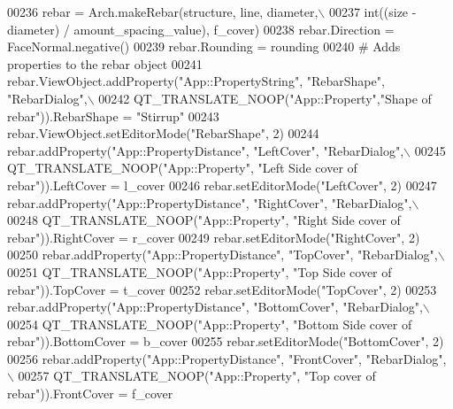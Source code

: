 \begin{DoxyCode}
00236         rebar = Arch.makeRebar(structure, line, diameter,\(\backslash\)
00237             int((size - diameter) / amount\_spacing\_value), f\_cover)
00238     rebar.Direction = FaceNormal.negative()
00239     rebar.Rounding = rounding
00240     \textcolor{comment}{# Adds properties to the rebar object}
00241     rebar.ViewObject.addProperty(\textcolor{stringliteral}{"App::PropertyString"}, \textcolor{stringliteral}{"RebarShape"}, \textcolor{stringliteral}{"RebarDialog"},\(\backslash\)
00242         QT\_TRANSLATE\_NOOP(\textcolor{stringliteral}{"App::Property"},\textcolor{stringliteral}{"Shape of rebar"})).RebarShape = \textcolor{stringliteral}{"Stirrup"}
00243     rebar.ViewObject.setEditorMode(\textcolor{stringliteral}{"RebarShape"}, 2)
00244     rebar.addProperty(\textcolor{stringliteral}{"App::PropertyDistance"}, \textcolor{stringliteral}{"LeftCover"}, \textcolor{stringliteral}{"RebarDialog"},\(\backslash\)
00245         QT\_TRANSLATE\_NOOP(\textcolor{stringliteral}{"App::Property"}, \textcolor{stringliteral}{"Left Side cover of rebar"})).LeftCover = l\_cover
00246     rebar.setEditorMode(\textcolor{stringliteral}{"LeftCover"}, 2)
00247     rebar.addProperty(\textcolor{stringliteral}{"App::PropertyDistance"}, \textcolor{stringliteral}{"RightCover"}, \textcolor{stringliteral}{"RebarDialog"},\(\backslash\)
00248         QT\_TRANSLATE\_NOOP(\textcolor{stringliteral}{"App::Property"}, \textcolor{stringliteral}{"Right Side cover of rebar"})).RightCover = r\_cover
00249     rebar.setEditorMode(\textcolor{stringliteral}{"RightCover"}, 2)
00250     rebar.addProperty(\textcolor{stringliteral}{"App::PropertyDistance"}, \textcolor{stringliteral}{"TopCover"}, \textcolor{stringliteral}{"RebarDialog"},\(\backslash\)
00251         QT\_TRANSLATE\_NOOP(\textcolor{stringliteral}{"App::Property"}, \textcolor{stringliteral}{"Top Side cover of rebar"})).TopCover = t\_cover
00252     rebar.setEditorMode(\textcolor{stringliteral}{"TopCover"}, 2)
00253     rebar.addProperty(\textcolor{stringliteral}{"App::PropertyDistance"}, \textcolor{stringliteral}{"BottomCover"}, \textcolor{stringliteral}{"RebarDialog"},\(\backslash\)
00254         QT\_TRANSLATE\_NOOP(\textcolor{stringliteral}{"App::Property"}, \textcolor{stringliteral}{"Bottom Side cover of rebar"})).BottomCover = b\_cover
00255     rebar.setEditorMode(\textcolor{stringliteral}{"BottomCover"}, 2)
00256     rebar.addProperty(\textcolor{stringliteral}{"App::PropertyDistance"}, \textcolor{stringliteral}{"FrontCover"}, \textcolor{stringliteral}{"RebarDialog"},\(\backslash\)
00257         QT\_TRANSLATE\_NOOP(\textcolor{stringliteral}{"App::Property"}, \textcolor{stringliteral}{"Top cover of rebar"})).FrontCover = f\_cover

\end{DoxyCode}
